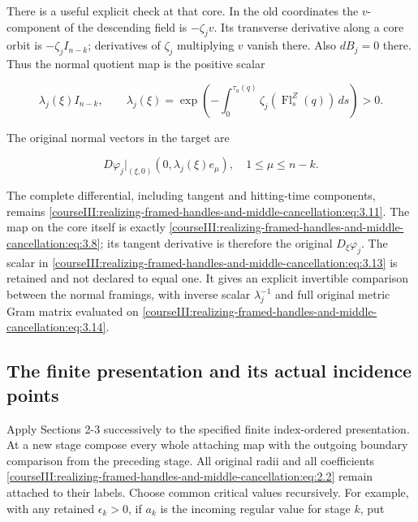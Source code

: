 There is a useful explicit check at that core. In the old coordinates the \(v\)-component of the descending field is \(-\zeta_j v\). Its transverse derivative along a core orbit is \(-\zeta_j I_{n-k}\); derivatives of \(\zeta_j\) multiplying \(v\) vanish there. Also \(dB_j=0\) there. Thus the normal quotient map is the positive scalar

\begin{equation}
\lambda_j(\xi) I_{n-k},\qquad
 \lambda_j(\xi)=
       \exp\left(-\int_0^{\tau_a(q)}
                    \zeta_j(\operatorname{Fl}^{Z}_s(q))\,ds\right)>0.
 \label{courseIII:realizing-framed-handles-and-middle-cancellation:eq:3.13}
\end{equation}

The original normal vectors in the target are

\begin{equation}
D\varphi_j|_{(\xi,0)}(0,\lambda_j(\xi)e_\mu),
 \quad 1\leq\mu\leq n-k.
 \label{courseIII:realizing-framed-handles-and-middle-cancellation:eq:3.14}
\end{equation}

The complete differential, including tangent and hitting-time components, remains \eqref{courseIII:realizing-framed-handles-and-middle-cancellation:eq:3.11}. The map on the core itself is exactly \eqref{courseIII:realizing-framed-handles-and-middle-cancellation:eq:3.8}; its tangent derivative is therefore the original \(D_\xi\varphi_j\). The scalar in \eqref{courseIII:realizing-framed-handles-and-middle-cancellation:eq:3.13} is retained and not declared to equal one. It gives an explicit invertible comparison between the normal framings, with inverse scalar \(\lambda_j^{-1}\) and full original metric Gram matrix evaluated on \eqref{courseIII:realizing-framed-handles-and-middle-cancellation:eq:3.14}.

\subsection{The finite presentation and its actual incidence points}
\label{courseIII:realizing-framed-handles-and-middle-cancellation:middle-actual-incidence}

\label{courseIII:realizing-framed-handles-and-middle-cancellation:section-4}\label{courseIII:middle-cancel:4}

Apply Sections 2-3 successively to the specified finite index-ordered presentation. At a new stage compose every whole attaching map with the outgoing boundary comparison from the preceding stage. All original radii and all coefficients \eqref{courseIII:realizing-framed-handles-and-middle-cancellation:eq:2.2} remain attached to their labels. Choose common critical values recursively. For example, with any retained \(\epsilon_k>0\), if \(a_k\) is the incoming regular value for stage \(k\), put

